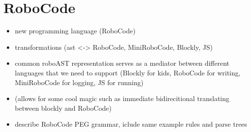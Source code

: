 \section{RoboCode}

\begin{itemize}
\item new programming language (RoboCode)
\item transformations (ast <-> RoboCode, MiniRoboCode, Blockly, JS)
\item common roboAST representation serves as a mediator between different languages
      that we need to support (Blockly for kids, RoboCode for writing,
      MiniRoboCode for logging, JS for running)
\item (allows for some cool magic such as immediate bidirecitional translating between blockly and RoboCode)
\item describe RoboCode PEG grammar, iclude same example rules and parse trees
\end{itemize}



